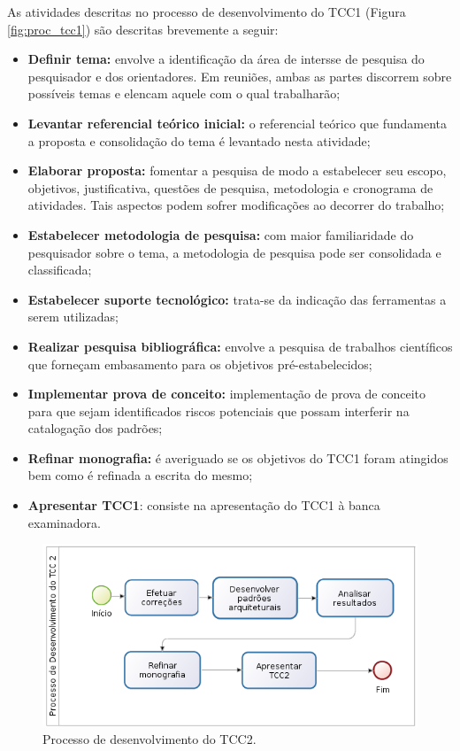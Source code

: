 As atividades descritas no processo de desenvolvimento do TCC1 (Figura \ref{fig:proc_tcc1}) são descritas brevemente a seguir:

\begin{itemize}
    \item \textbf{Definir tema:} envolve a identificação da área de intersse de pesquisa do pesquisador e dos orientadores. Em reuniões, ambas as partes discorrem sobre possíveis temas e elencam aquele com o qual trabalharão;
    \item \textbf{Levantar referencial teórico inicial:} o referencial teórico que fundamenta a proposta e consolidação do tema é levantado nesta atividade;
    \item \textbf{Elaborar proposta:} fomentar a pesquisa de modo a estabelecer seu escopo, objetivos, justificativa, questões de pesquisa, metodologia e cronograma de atividades. Tais aspectos podem sofrer modificações ao decorrer do trabalho;
    \item \textbf{Estabelecer metodologia de pesquisa:} com maior familiaridade do pesquisador sobre o tema, a metodologia de pesquisa pode ser consolidada e classificada;
    \item \textbf{Estabelecer suporte tecnológico:} trata-se da indicação das ferramentas a serem utilizadas;
    \item \textbf{Realizar pesquisa bibliográfica:} envolve a pesquisa de trabalhos científicos que forneçam embasamento para os objetivos pré-estabelecidos;
    \item \textbf{Implementar prova de conceito:} implementação de prova de conceito para que sejam  identificados riscos potenciais que possam interferir na catalogação dos padrões;
    \item \textbf{Refinar monografia:} é averiguado se os objetivos do TCC1 foram atingidos bem como é refinada a escrita do mesmo;
    \item \textbf{Apresentar TCC1}: consiste na apresentação do TCC1 à banca examinadora.
\end{itemize}



\begin{figure}[!htb]
\centering
\includegraphics[scale=0.6]{figuras/processo_tcc2}
\caption{Processo de desenvolvimento do TCC2.}
\label{fig:proc_tcc2}
\end{figure}

